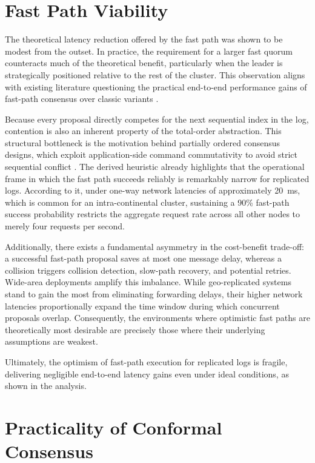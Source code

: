 \section{Fast Path Viability}
\label{sec:fast_path_viability}

The theoretical latency reduction offered by the fast path was shown to be modest from the outset. In practice, the requirement for a larger fast quorum counteracts much of the theoretical benefit, particularly when the leader is strategically positioned relative to the rest of the cluster. This observation aligns with existing literature questioning the practical end-to-end performance gains of fast-path consensus over classic variants \cite{Junqueira-ClassicVsFastPaxos-2007}.

Because every proposal directly competes for the next sequential index in the log, contention is also an inherent property of the total-order abstraction. This structural bottleneck is the motivation behind partially ordered consensus designs, which exploit application-side command commutativity to avoid strict sequential conflict \cite{Moraru-Epaxos-2013}. The derived heuristic already highlights that the operational frame in which the fast path succeeds reliably is remarkably narrow for replicated logs. According to it, under one-way network latencies of approximately 20~ms, which is common for an intra-continental cluster, sustaining a 90\% fast-path success probability restricts the aggregate request rate across all other nodes to merely four requests per second.

Additionally, there exists a fundamental asymmetry in the cost-benefit trade-off: a successful fast-path proposal saves at most one message delay, whereas a collision triggers collision detection, slow-path recovery, and potential retries. Wide-area deployments amplify this imbalance. While geo-replicated systems stand to gain the most from eliminating forwarding delays, their higher network latencies proportionally expand the time window during which concurrent proposals overlap. Consequently, the environments where optimistic fast paths are theoretically most desirable are precisely those where their underlying assumptions are weakest.

Ultimately, the optimism of fast-path execution for replicated logs is fragile, delivering negligible end-to-end latency gains even under ideal conditions, as shown in the analysis.


\section{Practicality of Conformal Consensus}
\label{sec:practicality_of_conformal_consensus}

